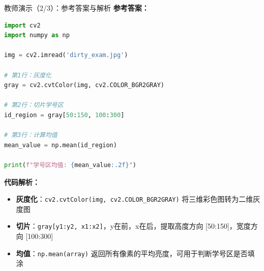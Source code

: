 \begin{frame}[fragile]{教师演示（2/3）：参考答案与解析}
	\textbf{参考答案：}

	\begin{lstlisting}[language=Python, basicstyle=\ttfamily\tiny]
import cv2
import numpy as np

img = cv2.imread('dirty_exam.jpg')

# 第1行：灰度化
gray = cv2.cvtColor(img, cv2.COLOR_BGR2GRAY)

# 第2行：切片学号区
id_region = gray[50:150, 100:300]

# 第3行：计算均值
mean_value = np.mean(id_region)

print(f"学号区均值: {mean_value:.2f}")
\end{lstlisting}

	\vspace{0.3cm}
	\textbf{代码解析：}
	\begin{itemize}
		\item \textbf{灰度化}：\texttt{cv2.cvtColor(img, cv2.COLOR\_BGR2GRAY)} 将三维彩色图转为二维灰度图
		\item \textbf{切片}：\texttt{gray[y1:y2, x1:x2]}，y在前，x在后，提取高度方向 [50:150]，宽度方向 [100:300]
		\item \textbf{均值}：\texttt{np.mean(array)} 返回所有像素的平均亮度，可用于判断学号区是否填涂
	\end{itemize}
\end{frame}

